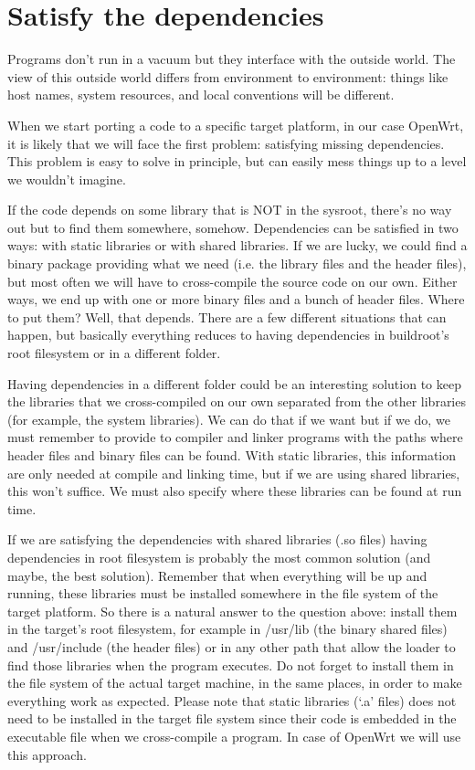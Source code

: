\chapter{Satisfy the dependencies}\label{tangservice}

Programs don’t run in a vacuum but they interface with the outside world.
The view of this outside world differs from environment to environment: things like host names, system resources, and
local conventions will be different.

When we start porting a code to a specific target platform, in our case OpenWrt, it is likely that we will face the first problem: satisfying missing dependencies.
This problem is easy to solve in principle, but can easily mess things up to a level we wouldn’t imagine.

If the code depends on some library that is NOT in the sysroot, there’s no way out but to find them somewhere, somehow.
Dependencies can be satisfied in two ways: with static libraries or with shared libraries.
If we are lucky, we could find a binary package providing what we need (i.e. the library files and the header files), but most often we will have to cross-compile the source code on our own.
Either ways, we end up with one or more binary files and a bunch of header files.
Where to put them? Well, that depends.
There are a few different situations that can happen, but basically everything reduces to having dependencies in buildroot's root filesystem or in a different folder.

Having dependencies in a different folder could be an interesting solution to keep the libraries that we cross-compiled on our own separated from the other libraries (for example, the system libraries).
We can do that if we want but if we do, we must remember to provide to compiler and linker programs with the paths where header files and binary files can be found.
With static libraries, this information are only needed at compile and linking time, but if we are using shared libraries, this won’t suffice.
We must also specify where these libraries can be found at run time.

If we are satisfying the dependencies with shared libraries (.so files) having dependencies in root filesystem is probably the most common solution (and maybe, the best solution).
Remember that when everything will be up and running, these libraries must be installed somewhere in the file system of the target platform.
So there is a natural answer to the question above: install them in the target's root filesystem, for example in /usr/lib (the binary shared files) and /usr/include (the header files) or in any other path that allow the loader to find those libraries when the program executes.
Do not forget to install them in the file system of the actual target machine, in the same places, in order to make everything work as expected.
Please note that static libraries (‘.a’ files) does not need to be installed in the target file system since their code is embedded in the executable file when we cross-compile a program.
In case of OpenWrt we will use this approach.

